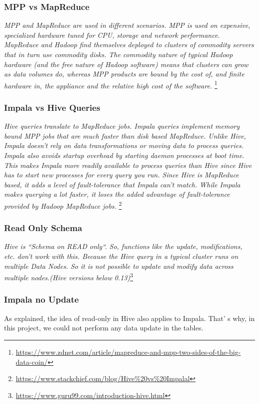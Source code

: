 \documentclass{article}
\begin{document}
\subsubsection{MPP vs MapReduce}
\textit{
MPP and MapReduce are used in different scenarios.
MPP is used on expensive, specialized hardware tuned for CPU, storage and network performance. MapReduce and Hadoop find themselves deployed to clusters of commodity servers that in turn use commodity disks. The commodity nature of typical Hadoop hardware (and the free nature of Hadoop software) means that clusters can grow as data volumes do, whereas MPP products are bound by the cost of, and finite hardware in, the appliance and the relative high cost of the software.}
\footnote{\url{https://www.zdnet.com/article/mapreduce-and-mpp-two-sides-of-the-big-data-coin/}}


\subsubsection{Impala vs Hive Queries}
\textit{Hive queries translate to MapReduce jobs. Impala queries implement memory bound MPP jobs that are much faster than disk based MapReduce. Unlike Hive, Impala doesn't rely on data transformations or moving data to process queries. Impala also avoids startup overhead by starting daemon processes at boot time. This makes Impala more readily available to process queries than Hive since Hive has to start new processes for every query you run.
Since Hive is MapReduce based, it adds a level of fault-tolerance that Impala can't match. While Impala makes querying a lot faster, it loses the added advantage of fault-tolerance provided by Hadoop MapReduce jobs.}
\footnote{\url{https://www.stackchief.com/blog/Hive\%20vs\%20Impalal}}


\subsubsection{Read Only Schema}
\textit{Hive is “Schema on READ only“. So, functions like the update, modifications, etc. don’t work with this. Because the Hive query in a typical cluster runs on multiple Data Nodes. So it is not possible to update and modify data across multiple nodes.(Hive versions below 0.13)}\footnote{\url{https://www.guru99.com/introduction-hive.html}}

\subsubsection{Impala no Update}
As explained, the idea of read-only in Hive also applies to Impala. That' s why, in this project, we could not perform any data update in the tables.
\end{document}
